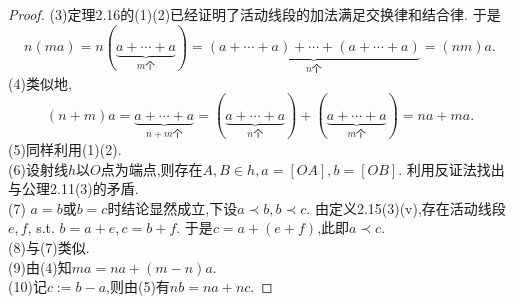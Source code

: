 \begin{proof}
    (3)定理2.16的(1)(2)已经证明了活动线段的加法满足交换律和结合律.
    于是\[n(ma)=n(\underbrace{a+\cdots+a}_{m\text{个}}) 
	=\underbrace{(a+\cdots+a)+\cdots+(a+\cdots+a)}_{n\text{个}}
    =(nm)a.\]
    (4)类似地,\[(n+m)a=\underbrace{a+\cdots+a}_{n+m\text{个}}=
    (\underbrace{a+\cdots+a}_{n\text{个}})+
    (\underbrace{a+\cdots+a}_{m\text{个}})=na+ma.\]
    (5)同样利用(1)(2).\\
    (6)设射线$h$以$O$点为端点,则存在$A,B\in h,a=[OA],b=[OB]$.
    利用反证法找出与公理2.11(3)的矛盾.\\
    (7) $a=b$或$b=c$时结论显然成立,下设$a\prec b,b\prec c$.
    由定义2.15(3)(v),存在活动线段$e,f$, s.t. $b=a+e,c=b+f$.
    于是$c=a+(e+f)$,此即$a\prec c$.\\
    (8)与(7)类似.\\
    (9)由(4)知$ma=na+(m-n)a$.\\
    (10)记$c:=b-a$,则由(5)有$nb=na+nc$.
\end{proof}

